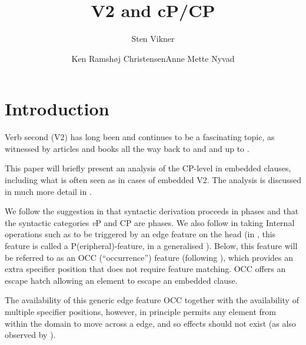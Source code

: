\documentclass[output=paper]{LSP/langsci}
\author{Sten Vikner\and Ken Ramshøj Christensen\lastand Anne Mette Nyvad\affiliation{Dept. of English, Aarhus University, Denmark}
}
\title{V2 and cP/CP}
\begin{document}





\section{ Introduction}

Verb second (V2) has long been and continues to be a fascinating topic, as witnessed by articles and books all the way back to \citet{Wackernagel1892} and \citet{Fourquet1938} and up to \citet{Holmberg2015verbsecond}. 

This paper will briefly present an analysis of the CP-level in embedded clauses, including what is often seen as  in cases of embedded V2. The analysis is discussed in much more detail in \citet{NyvadEtAl2016}.

We follow the suggestion in \citet{Chomsky2000} that syntactic derivation proceeds in phases and that the syntactic categories \textit{v}P and CP are phases. We also follow \citet{Chomsky2005,Chomsky2006} in taking Internal  operations such as  to be triggered by an edge feature on the  head (in \citealt{Chomsky2000}, this feature is called a P(eripheral)-feature, in \citealt{Chomsky2001} a generalised ). Below, this feature will be referred to as an OCC (``occurrence'') feature (following \citealt[18]{Chomsky2005}), which provides an extra specifier position that does not require feature matching. OCC offers an escape hatch allowing an element to escape an embedded clause. 

The availability of this generic edge feature OCC together with the availability of multiple specifier positions, however, in principle permits any element from within the  domain to move across a  edge, and so  effects should not exist (as also observed by  \citealt[60--61]{Boeckx2012}).
\end{document}
